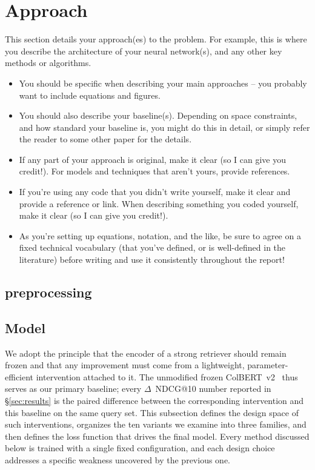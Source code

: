 \section{Approach}
This section details your approach(es) to the problem. 
For example, this is where you describe the architecture of your neural network(s), and any other key methods or algorithms.
\begin{itemize}
    \item You should be specific when describing your main approaches – you probably want to include equations and figures.
    \item You should also describe your baseline(s). Depending on space constraints, and how standard your baseline is, you might do this in detail, or simply refer the reader to some other paper for the details.
    \item If any part of your approach is original, make it clear (so I can give you credit!). For models and techniques that aren't yours, provide references.
    \item If you’re using any code that you didn't write yourself, make it clear and provide a reference or link. When describing something you coded yourself, make it clear (so I can give you credit!).
    \item As you’re setting up equations, notation, and the like, be sure to agree on a fixed technical vocabulary (that you've defined, or is well-defined in the literature) before writing and use it consistently throughout the report!

\end{itemize}
\subsection{preprocessing~}
\subsection{Model}
\label{sec:model}

We adopt the principle that the encoder of a strong retriever should remain frozen and that any improvement must come from a lightweight, parameter-efficient intervention attached to it. The unmodified frozen ColBERT~v2~\cite{santhanam2022colbertv2} thus serves as our primary baseline; every $\Delta$~NDCG@10 number reported in \S\ref{sec:results} is the paired difference between the corresponding intervention and this baseline on the same query set. This subsection defines the design space of such interventions, organizes the ten variants we examine into three families, and then defines the loss function that drives the final model. Every method discussed below is trained with a single fixed configuration, and each design choice addresses a specific weakness uncovered by the previous one.

